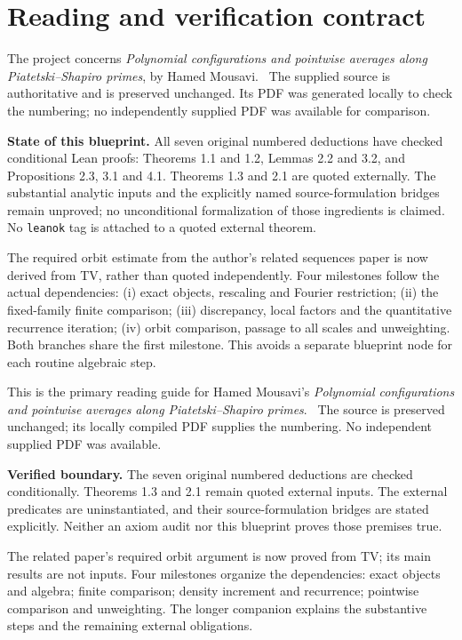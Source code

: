 \section*{Reading and verification contract}
\ifDetailed
The project concerns \emph{Polynomial configurations and pointwise averages along Piatetski--Shapiro primes}, by Hamed Mousavi. \versionnote\ The supplied source is authoritative and is preserved unchanged. Its PDF was generated locally to check the numbering; no independently supplied PDF was available for comparison.

\textbf{State of this blueprint.} All seven original numbered deductions have checked conditional Lean proofs: Theorems 1.1 and 1.2, Lemmas 2.2 and 3.2, and Propositions 2.3, 3.1 and 4.1. Theorems 1.3 and 2.1 are quoted externally. The substantial analytic inputs and the explicitly named source-formulation bridges remain unproved; no unconditional formalization of those ingredients is claimed. No \texttt{leanok} tag is attached to a quoted external theorem.

The required orbit estimate from the author's related sequences paper is now derived from TV, rather than quoted independently. Four milestones follow the actual dependencies: (i) exact objects, rescaling and Fourier restriction; (ii) the fixed-family finite comparison; (iii) discrepancy, local factors and the quantitative recurrence iteration; (iv) orbit comparison, passage to all scales and unweighting. Both branches share the first milestone. This avoids a separate blueprint node for each routine algebraic step.

\else
This is the primary reading guide for Hamed Mousavi's \emph{Polynomial configurations and pointwise averages along Piatetski--Shapiro primes}. \versionnote\ The source is preserved unchanged; its locally compiled PDF supplies the numbering. No independent supplied PDF was available.

\textbf{Verified boundary.} The seven original numbered deductions are checked conditionally. Theorems 1.3 and 2.1 remain quoted external inputs. The external predicates are uninstantiated, and their source-formulation bridges are stated explicitly. Neither an axiom audit nor this blueprint proves those premises true.

The related paper's required orbit argument is now proved from TV; its main results are not inputs. Four milestones organize the dependencies: exact objects and algebra; finite comparison; density increment and recurrence; pointwise comparison and unweighting. The longer companion explains the substantive steps and the remaining external obligations.
\fi

